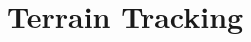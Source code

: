 \chapter{Terrain Tracking}
\label{chap:sixth}
\ifpdf
    \graphicspath{{Chapter6/Figures/PNG/}{Chapter6/Figures/PDF/}{Chapter6/Figures/}{Chapter6/Figures/EPS/}}
\else
    \graphicspath{{Chapter6/Figures/EPS/}{Chapter6/Figures/}}
\fi